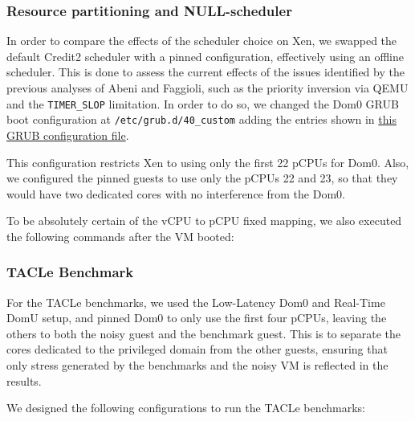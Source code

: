 \subsubsection{Resource partitioning and
NULL-scheduler}\label{resource-partitioning-and-null-scheduler}

In order to compare the effects of the scheduler choice on Xen, we
swapped the default Credit2 scheduler with a pinned configuration,
effectively using an offline scheduler. This is done to assess the
current effects of the issues identified by the previous analyses of
Abeni and Faggioli, such as the priority inversion via QEMU and the
\texttt{TIMER\_SLOP} limitation. In order to do so, we changed the Dom0
GRUB boot configuration at \texttt{/etc/grub.d/40\_custom} adding the
entries shown in \href{Xen/grub_cfg/40_custom}{this GRUB configuration
file}.

This configuration restricts Xen to using only the first 22 pCPUs for
Dom0. Also, we configured the pinned guests to use only the pCPUs 22 and
23, so that they would have two dedicated cores with no interference
from the Dom0.

To be absolutely certain of the vCPU to pCPU fixed mapping, we also
executed the following commands after the VM booted:

\begin{Shaded}
\begin{Highlighting}[]
\end{Highlighting}
\end{Shaded}

\subsubsection{TACLe Benchmark}\label{tacle-benchmark-1}

For the TACLe benchmarks, we used the Low-Latency Dom0 and Real-Time
DomU setup, and pinned Dom0 to only use the first four pCPUs, leaving
the others to both the noisy guest and the benchmark guest. This is to
separate the cores dedicated to the privileged domain from the other
guests, ensuring that only stress generated by the benchmarks and the
noisy VM is reflected in the results.

We designed the following configurations to run the TACLe benchmarks:

